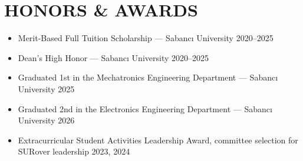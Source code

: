 \section*{HONORS \& AWARDS}

\begin{itemize}
  \item Merit-Based Full Tuition Scholarship --- Sabancı University \hfill 2020--2025
  \item Dean's High Honor --- Sabancı University \hfill 2020--2025
  \item Graduated 1st in the Mechatronics Engineering Department --- Sabancı University \hfill 2025
  \item Graduated 2nd in the Electronics Engineering Department --- Sabancı University \hfill 2026
  \item Extracurricular Student Activities Leadership Award, committee selection for SURover leadership \hfill 2023, 2024
\end{itemize}

